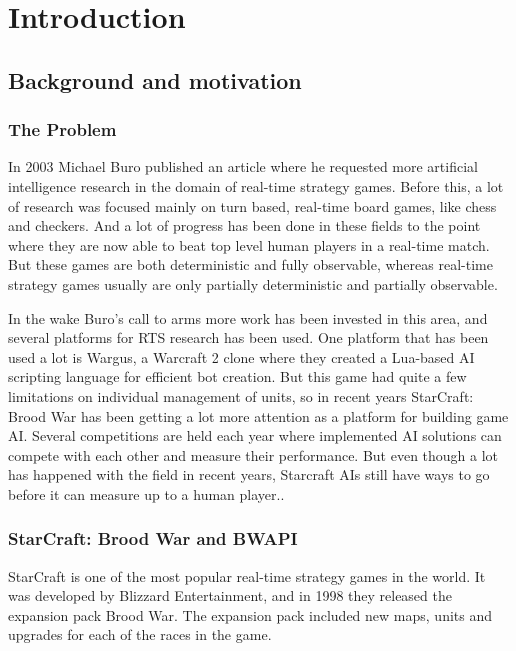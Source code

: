 
\chapter{Introduction}

\section{Background and motivation}

\subsection{The Problem}
In 2003 Michael Buro published an article where he requested more artificial
intelligence research in the domain of real-time strategy
games.\cite{buro2003real} Before this, a lot of research was focused mainly on
turn based, real-time board games, like chess and checkers. And a lot of
progress has been done in these fields to the point where they are now able to
beat top level human players in a real-time match. \cite{campbell2002deep} But
these games are both deterministic and fully observable, whereas real-time
strategy games usually are only partially deterministic and partially
observable.

In the wake Buro's call to arms more work has been invested in this area, and
several platforms for RTS research has been used. One platform that has been
used a lot is Wargus\cite{wargus}, a Warcraft 2 clone where they created a
Lua-based AI scripting language for efficient bot creation. But this game had
quite a few limitations on individual management of units, so in recent years
StarCraft: Brood War has been getting a lot more attention as a platform for
building game AI. Several competitions are held each year where implemented AI
solutions can compete with each other and measure their performance. But even
though a lot has happened with the field in recent years, Starcraft AIs still
have ways to go before it can measure up to a human player.\cite{eisbotvsfong}.

\subsection{StarCraft: Brood War and BWAPI}
StarCraft is one of the most popular real-time strategy games in the world. It
was developed by Blizzard Entertainment, and in 1998 they released the expansion
pack Brood War. The expansion pack included new maps, units and upgrades for
each of the races in the game.
 
